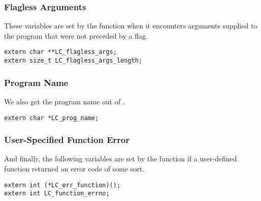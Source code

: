 \subsubsection{Flagless Arguments}

These variables are set by the  function when it encounters arguments supplied to the program that were not preceded by a flag.

\begin{verbatim}
extern char **LC_flagless_args;
extern size_t LC_flagless_args_length;
\end{verbatim}

\subsubsection{Program Name}

We also get the program name out of .

\begin{verbatim}
extern char *LC_prog_name;
\end{verbatim}

\subsubsection{User-Specified Function Error}

And finally, the following variables are set by the  function if a user-defined function returned an error code of some sort.

\begin{verbatim}
extern int (*LC_err_function)();
extern int LC_function_errno;
\end{verbatim}